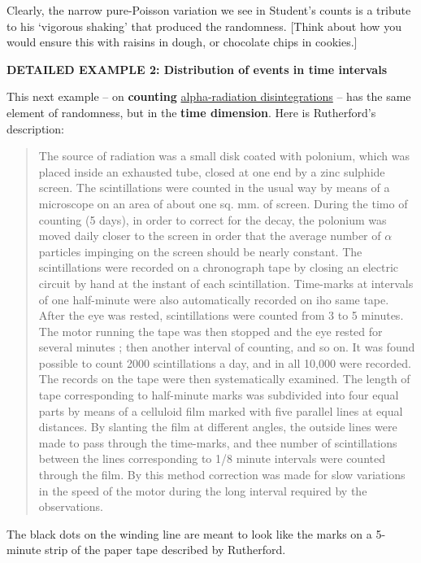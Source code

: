 \documentclass[]{book}
\begin{document}
Clearly, the narrow pure-Poisson variation we see in Student's counts is a tribute to his `vigorous shaking' that produced the randomness. {[}Think about how you would ensure this with raisins in dough, or chocolate chips in cookies.{]}

\textbf{DETAILED EXAMPLE 2: Distribution of events in time intervals}

This next example -- on \textbf{counting} \href{http://www.medicine.mcgill.ca/epidemiology/hanley/bios601/Intensity-Rate/RutherfordGeigerBateman1910.pdf}{alpha-radiation disintegrations} -- has the same element of randomness, but in the \textbf{time dimension}. Here is Rutherford's description:

\begin{quote}
The source of radiation was a small disk coated with polonium, which was placed inside an exhausted tube, closed at one end by a zinc sulphide screen. The scintillations were counted in the usual way by means of a microscope on an area of about one sq. mm. of screen. During the timo of counting (5 days), in order to correct for the decay, the polonium was moved daily closer to the screen in order that the average number of \(\alpha\) particles impinging on the screen should be nearly constant. The scintillations were recorded on a chronograph tape by closing an electric circuit by hand at the instant of each scintillation. Time-marks at intervals of one half-minute were also automatically recorded on iho same tape.\\
After the eye was rested, scintillations were counted from 3 to 5 minutes. The motor running the tape was then stopped and the eye rested for several minutes ; then another interval of counting, and so on. It was found possible to count 2000 scintillations a day, and in all 10,000 were recorded. The records on the tape were then systematically examined. The length of tape corresponding to half-minute marks was subdivided into four equal parts by means of a celluloid film marked with five parallel lines at equal distances. By slanting the film at different angles, the outside lines were made to pass through the time-marks, and thee number of scintillations between the lines corresponding to 1/8 minute intervals were counted through the film. By this method correction was made for slow variations in the speed of the motor during the long interval required by the observations.
\end{quote}

The black dots on the winding line are meant to look like the marks on a 5-minute strip of the paper tape described by Rutherford.
\end{document}
